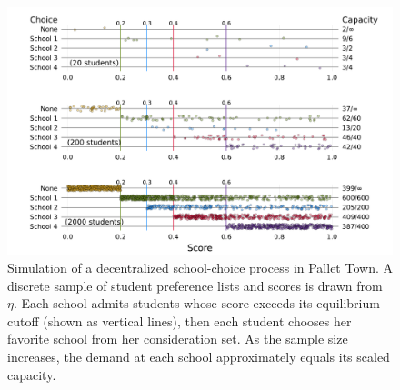 \documentclass[12pt]{article}
\numberwithin{equation}{subsection}
\theoremstyle{definition}
\begin{document}
\begin{figure}
\begin{center}\includegraphics[width=\linewidth, ]{plots/score-cutoff-choice.pdf}\end{center}
\captionsetup{singlelinecheck=off}
    \caption[.]{Simulation of a decentralized school-choice process in Pallet Town. A discrete sample of student preference lists and scores is drawn from $\eta$. Each school admits students whose score exceeds its equilibrium cutoff (shown as vertical lines), then each student chooses her favorite school from her consideration set. As the sample size increases, the demand at each school approximately equals its scaled capacity.}
\label{score-cutoff-choice}
\end{figure}
\end{document}
